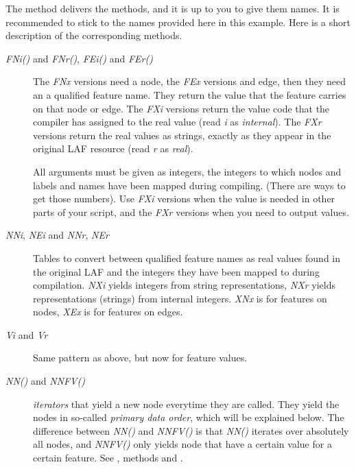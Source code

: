 \documentclass[letterpaper,10pt,english]{sphinxmanual}
\begin{document}
The method {\hyperref[graf/graf:graf.task.GrafTask.get_mappings]{}} delivers the methods,
and it is up to you to give them names.
It is recommended to stick to the names provided here in this example.
Here is a short description of the corresponding methods.
\begin{description}
\item[{\emph{FNi()} and \emph{FNr()}, \emph{FEi()} and \emph{FEr()}}] \leavevmode
The \emph{FNx} versions need a node, the \emph{FEx} versions and edge,
then they need an a qualified feature name.
They return the value that the feature carries on that node or edge.
The \emph{FXi} versions return the value code that the compiler has assigned
to the real value (read \emph{i} as \emph{internal}).
The \emph{FXr} versions return the real values as strings, exactly as
they appear in the original LAF resource (read \emph{r} as \emph{real}).

All arguments must be given as integers,
the integers to which nodes and labels and names have been mapped during compiling.
(There are ways to get those numbers).
Use \emph{FXi} versions when the value is needed in other parts of your script,
and the \emph{FXr} versions when you need to output values.

\item[{\emph{NNi}, \emph{NEi} and \emph{NNr}, \emph{NEr}}] \leavevmode
Tables to convert between qualified feature names as real values
found in the original LAF and the integers they have been mapped to during compilation.
\emph{NXi} yields integers from string representations,
\emph{NXr} yields representations (strings) from internal integers.
\emph{XNx} is for features on nodes,
\emph{XEx} is for features on edges.

\item[{\emph{Vi} and \emph{Vr}}] \leavevmode
Same pattern as above, but now for feature values.

\item[{\emph{NN()} and \emph{NNFV()}}] \leavevmode
\emph{iterators} that yield a new node everytime they are called.
They yield the nodes in so-called \emph{primary data order}, which will be explained below.
The difference between \emph{NN()} and \emph{NNFV()} is
that \emph{NN()} iterates over absolutely all nodes,
and \emph{NNFV()} only yields node that have a certain value for a certain feature.
See {\hyperref[graf/graf:module-graf.task]{}},
methods {\hyperref[graf/graf:graf.task.GrafTask.next_node]{}}
and {\hyperref[graf/graf:graf.task.GrafTask.next_node_with_fval]{}}.

\end{description}
\end{document}
